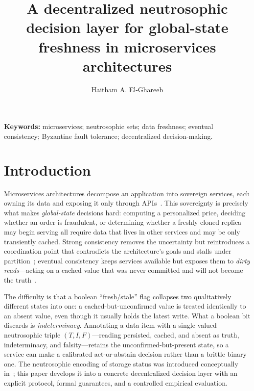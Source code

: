 \documentclass[fleqn,10pt]{wlscirep}
\title{A decentralized neutrosophic decision layer for global-state freshness in microservices architectures}
\author[1,*]{Haitham A. El-Ghareeb}
\affil[1]{Information Systems Department, Faculty of Computers and Information Sciences, Mansoura University, Mansoura, Egypt}
\affil[*]{Corresponding author: helghareeb@mans.edu.eg}
\begin{document}
\flushbottom
\maketitle
\thispagestyle{empty}
\linenumbers

\noindent\textbf{Keywords:} microservices; neutrosophic sets; data freshness; eventual consistency;
Byzantine fault tolerance; decentralized decision-making.\\[6pt]

\section{Introduction}
\label{sec:intro}

Microservices architectures decompose an application into sovereign services, each owning its data
and exposing it only through APIs~\cite{soldani2018pains}. This sovereignty is precisely what makes
\emph{global-state} decisions hard: computing a personalized price, deciding whether an order is
fraudulent, or determining whether a freshly cloned replica may begin serving all require data that
lives in other services and may be only transiently cached. Strong consistency removes the
uncertainty but reintroduces a coordination point that contradicts the architecture's goals and
stalls under partition~\cite{pardon2018bac,abadi2012consistency}; eventual consistency keeps
services available but exposes them to \emph{dirty reads}---acting on a cached value that was never
committed and will not become the truth~\cite{laigner2021data}.

The difficulty is that a boolean ``fresh/stale'' flag collapses two qualitatively different states into
one: a cached-but-unconfirmed value is treated identically to an absent value, even though it usually
holds the latest write. What a boolean bit discards is \emph{indeterminacy}. Annotating a data item
with a single-valued neutrosophic triple $(T,I,F)$---reading persisted, cached, and absent as truth,
indeterminacy, and falsity---retains the unconfirmed-but-present state, so a service can make a
calibrated act-or-abstain decision rather than a brittle binary one. The neutrosophic encoding of
storage status was introduced conceptually in~\cite{elghareeb2020neutro}; this paper develops it into a
concrete decentralized decision layer with an explicit protocol, formal guarantees, and a controlled
empirical evaluation.
\end{document}
